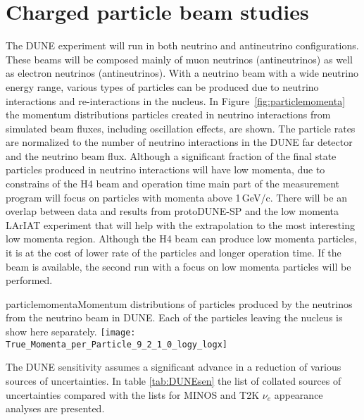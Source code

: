 \section{Charged particle beam studies}

The DUNE experiment will run in both neutrino and antineutrino 
configurations. These beams will be composed mainly of muon neutrinos (antineutrinos) as well as electron neutrinos (antineutrinos). With a neutrino beam with a wide neutrino energy range, various types of particles can be produced due to neutrino interactions and re-interactions in the nucleus.  In Figure~\ref{fig:particlemomenta} the momentum distributions particles created in neutrino interactions from simulated beam fluxes, including oscillation effects, are shown.  The particle rates are normalized  to the number of neutrino interactions in the DUNE far detector and the neutrino beam flux.  Although a significant fraction of the final state particles produced in neutrino interactions will have low momenta, due to constrains of the H4 beam and operation time main part of the measurement program will focus on particles with momenta above 1\,GeV/c. There will be an overlap between data and results from protoDUNE-SP and the low momenta LArIAT experiment that will help with the extrapolation to the most interesting low momenta region.  Although the H4 beam can produce low momenta particles, it is at the cost of lower rate of the particles and longer operation time. If the beam is available, the second run with a focus on low momenta particles will be performed. 


\begin{cdrfigure} {particlemomenta}{Momentum distributions of particles produced by the neutrinos from the neutrino beam in DUNE.  Each of the particles leaving the nucleus is show here separately. } 
  \texttt{[image: True\_Momenta\_per\_Particle\_9\_2\_1\_0\_logy\_logx]}
\end{cdrfigure}

The DUNE sensitivity assumes a significant advance in a reduction of various sources of uncertainties. In table \ref{tab:DUNEsen} the list of collated sources of uncertainties compared with the lists for MINOS and T2K $\nu_e$ appearance analyses are presented. 

